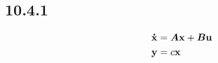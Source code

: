 \subsection{10.4.1}

\begin{subequations}
\begin{align}
	\mathbf{\dot{x}}	&= \bm{A} \mathbf{x} + \bm{B} \mathbf{u} \\
	\mathbf{y} 		&= c \mathbf{x}
\end{align}
\end{subequations}	
